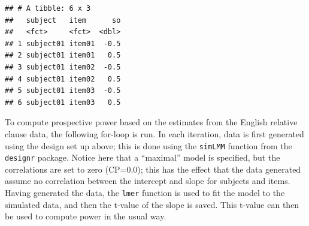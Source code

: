\documentclass[12pt,]{krantz}
\newenvironment{Shaded}{\begin{snugshade}}{\end{snugshade}}
\newcommand{\CommentTok}[1]{\textcolor[rgb]{0.56,0.35,0.01}{\textit{#1}}}
\newcommand{\DataTypeTok}[1]{\textcolor[rgb]{0.13,0.29,0.53}{#1}}
\newcommand{\DecValTok}[1]{\textcolor[rgb]{0.00,0.00,0.81}{#1}}
\newcommand{\KeywordTok}[1]{\textcolor[rgb]{0.13,0.29,0.53}{\textbf{#1}}}
\newcommand{\NormalTok}[1]{#1}
\newcommand{\OperatorTok}[1]{\textcolor[rgb]{0.81,0.36,0.00}{\textbf{#1}}}
\newcommand{\StringTok}[1]{\textcolor[rgb]{0.31,0.60,0.02}{#1}}
\begin{document}
\begin{Shaded}
\end{Shaded}

\begin{verbatim}
## # A tibble: 6 x 3
##   subject   item      so
##   <fct>     <fct>  <dbl>
## 1 subject01 item01  -0.5
## 2 subject01 item01   0.5
## 3 subject01 item02  -0.5
## 4 subject01 item02   0.5
## 5 subject01 item03  -0.5
## 6 subject01 item03   0.5
\end{verbatim}

To compute prospective power based on the estimates from the English relative clause data, the following for-loop is run. In each iteration, data is first generated using the design set up above; this is done using the \texttt{simLMM} function from the \texttt{designr} package. Notice here that a ``maximal'' model is specified, but the correlations are set to zero (CP=0.0); this has the effect that the data generated assume no correlation between the intercept and slope for subjects and items. Having generated the data, the \texttt{lmer} function is used to fit the model to the simulated data, and then the t-value of the slope is saved. This t-value can then be used to compute power in the usual way.
\end{document}
